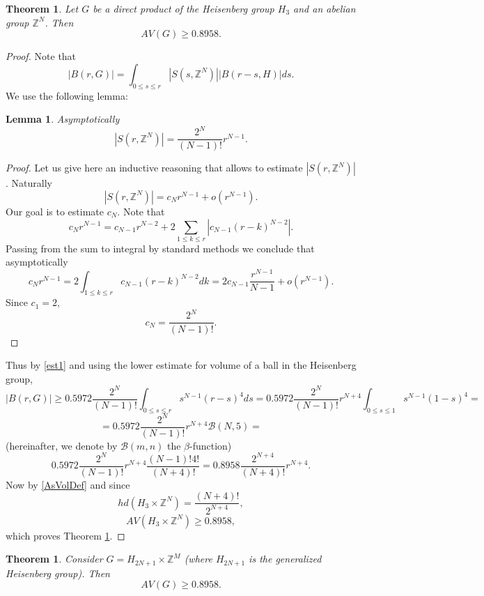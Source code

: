 \documentclass[11pt]{article}
\newcounter{razdel}[section]
\theoremstyle{Mystyle}
\newtheorem{Theorem}[razdel]{Theorem}
\newtheorem{Lemma}[razdel]{Lemma}
\begin{document}
\begin{Theorem}
\label{Th2}
Let $G$ be a direct product of the Heisenberg group $H_{3}$ and an abelian group $\mathbb{Z}^{N}$. Then 
$$AV(G)\geq 0.8958.$$
\end{Theorem}

\begin{proof}
Note that
\begin{equation}
\label{est1}
|B(r,G)| = \int_{0\leq s\leq r} |S(s,\mathbb{Z}^N)||B(r-s,H)|ds.
\end{equation}
We use the following lemma:

\begin{Lemma}
\label{Lem1}
Asymptotically
$$|S(r,\mathbb{Z}^N)| = \frac{2^N}{(N-1)!}r^{N-1}.$$
\end{Lemma}

\begin{proof}
Let us give here an inductive reasoning that allows to estimate $|S(r,\mathbb{Z}^N)|$.
Naturally
$$|S(r,\mathbb{Z}^N)| = c_N r^{N-1} + o(r^{N-1}).$$
Our goal is to estimate $c_N$.
Note that
$$c_Nr^{N-1} = c_{N-1}r^{N-2} + 2\sum_{1\leq k\leq r}|c_{N-1}(r-k)^{N-2}|.$$
Passing from the sum to integral by standard methods we conclude that asymptotically
$$c_Nr^{N-1} = 2\int_{1\leq k\leq r}c_{N-1} (r-k)^{N-2} dk = 2c_{N-1}\frac{r^{N-1}}{N-1} + o(r^{N-1}).$$
Since $c_1 = 2$,
$$c_N = \frac{2^N}{(N-1)!}.$$
\end{proof}

Thus by \eqref{est1} and using the lower estimate for volume of a ball in the Heisenberg group,
$$|B(r,G)| \geq 0.5972 \frac{2^{N}}{(N-1)!}\int_{0\leq s\leq r} s^{N-1}(r-s)^4 ds=
0.5972 \frac{2^{N}}{(N-1)!}r^{N+4}\int_{0\leq s\leq 1} s^{N-1}(1-s)^4 =$$
$$=0.5972 \frac{2^{N}}{(N-1)!}r^{N+4} \mathcal{B}(N,5)=$$
(hereinafter, we denote by $\mathcal{B}(m,n)$ the $\beta$-function)
$$0.5972\frac{2^{N}}{(N-1)!}r^{N+4}\frac{(N-1)! 4!}{(N+4)!} = 0.8958 \frac{2^{N+4}}{(N+4)!}r^{N+4}.$$
Now by \eqref{AsVolDef} and since 
$$hd(H_{3}\times \mathbb{Z}^{N}) = \frac{(N+4)!}{2^{N+4}},$$
$$AV(H_3\times \mathbb{Z}^N) \geq 0.8958,$$
which proves Theorem \ref{Th2}.
\end{proof}

\begin{Theorem}
\label{Th2}
Consider $G = H_{2N+1}\times \mathbb{Z}^{M}$ (where $H_{2N+1}$ is the generalized Heisenberg group). Then
$$AV(G)\geq 0.8958.$$
\end{Theorem}
\end{document}
